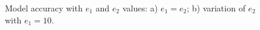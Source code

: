 \documentclass[runningheads]{llncs}
\begin{document}
\begin{figure}[ht]
    \begin{subfigure}[h]{0.5\linewidth}
    \caption{}
    \label{fig:epoch_size}
    \end{subfigure}
    \begin{subfigure}[h]{0.5\linewidth}
    \caption{}
    \label{fig:train_splines_every_epoch}
    \end{subfigure}
    \caption{%
    Model accuracy with $e_1$ and $e_2$ values: a) $e_1 = e_2$; b) variation of $e_2$ with $e_1 =10$.}
    \label{fig:epoch_size}
\end{figure}
 
\end{document}

